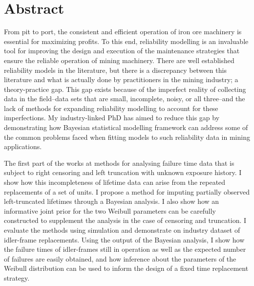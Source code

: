 
\chapter*{Abstract} 

From pit to port, the consistent and efficient operation of iron ore machinery is essential for maximizing profits. To this end, reliability modelling is an invaluable tool for improving the design and execution of the maintenance strategies that ensure the reliable operation of mining machinery. There are well established reliability models in the literature, but there is a discrepancy between this literature and what is actually done by practitioners in the mining industry; a theory-practice gap. This gap exists because of the imperfect reality of collecting data in the field--data sets that are small, incomplete, noisy, or all three--and the lack of methods for expanding reliability modelling to account for these imperfections. My industry-linked PhD has aimed to reduce this gap by demonstrating how Bayesian statistical modelling framework can address some of the common problems faced when fitting models to such reliability data in mining applications.

The first part of the works at methods for analysing failure time data that is subject to right censoring and left truncation with unknown exposure history. I show how this incompleteness of lifetime data can arise from the repeated replacements of a set of units. I propose a method for imputing partially observed left-truncated lifetimes through a Bayesian analysis. I also show how an informative joint prior for the two Weibull parameters can be carefully constructed to supplement the analysis in the case of censoring and truncation. I evaluate the methods using simulation and demonstrate on industry dataset of idler-frame replacements. Using the output of the Bayesian analysis, I show how the failure times of idler-frames still in operation as well as the expected number of failures are easily obtained, and how inference about the parameters of the Weibull distribution can be used to inform the design of a fixed time replacement strategy.

